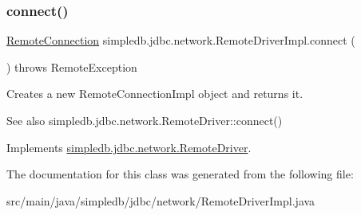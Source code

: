 \subsubsection{\texorpdfstring{connect()}{connect()}}
{\footnotesize\ttfamily \hyperlink{interfacesimpledb_1_1jdbc_1_1network_1_1RemoteConnection}{Remote\+Connection} simpledb.\+jdbc.\+network.\+Remote\+Driver\+Impl.\+connect (\begin{DoxyParamCaption}{ }\end{DoxyParamCaption}) throws Remote\+Exception\hspace{0.3cm}{\ttfamily [inline]}}

Creates a new Remote\+Connection\+Impl object and returns it. \begin{DoxySeeAlso}{See also}
simpledb.\+jdbc.\+network.\+Remote\+Driver\+::connect() 
\end{DoxySeeAlso}


Implements \hyperlink{interfacesimpledb_1_1jdbc_1_1network_1_1RemoteDriver}{simpledb.\+jdbc.\+network.\+Remote\+Driver}.



The documentation for this class was generated from the following file\+:\begin{DoxyCompactItemize}
\item 
src/main/java/simpledb/jdbc/network/Remote\+Driver\+Impl.\+java\end{DoxyCompactItemize}

